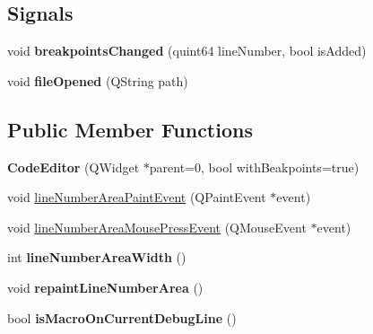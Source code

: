 \subsection*{Signals}
\begin{DoxyCompactItemize}
\item 
\hypertarget{class_code_editor_a462de76e30612853a2633b5175eaf778}{}void {\bfseries breakpoints\+Changed} (quint64 line\+Number, bool is\+Added)\label{class_code_editor_a462de76e30612853a2633b5175eaf778}

\item 
\hypertarget{class_code_editor_afb38d4c605648718eef7a15d8a1a4afd}{}void {\bfseries file\+Opened} (Q\+String path)\label{class_code_editor_afb38d4c605648718eef7a15d8a1a4afd}

\end{DoxyCompactItemize}
\subsection*{Public Member Functions}
\begin{DoxyCompactItemize}
\item 
\hypertarget{class_code_editor_a0f8a24cceec008bb6bd94c0dfc74aff5}{}{\bfseries Code\+Editor} (Q\+Widget $\ast$parent=0, bool with\+Beakpoints=true)\label{class_code_editor_a0f8a24cceec008bb6bd94c0dfc74aff5}

\item 
void \hyperlink{class_code_editor_a96e24088faa784a4ec419a647fcab5dd}{line\+Number\+Area\+Paint\+Event} (Q\+Paint\+Event $\ast$event)
\item 
void \hyperlink{class_code_editor_ae72a954985e8f12d755d22f33d6465ec}{line\+Number\+Area\+Mouse\+Press\+Event} (Q\+Mouse\+Event $\ast$event)
\item 
\hypertarget{class_code_editor_af7c3fbf0af03c4ff136e0298a336dd88}{}int {\bfseries line\+Number\+Area\+Width} ()\label{class_code_editor_af7c3fbf0af03c4ff136e0298a336dd88}

\item 
\hypertarget{class_code_editor_ab8e52f7d226ffbc0d7677e57ae138833}{}void {\bfseries repaint\+Line\+Number\+Area} ()\label{class_code_editor_ab8e52f7d226ffbc0d7677e57ae138833}

\item 
\hypertarget{class_code_editor_ad223a49b099ba8111fcd77a38b865166}{}bool {\bfseries is\+Macro\+On\+Current\+Debug\+Line} ()\label{class_code_editor_ad223a49b099ba8111fcd77a38b865166}

\end{DoxyCompactItemize}
